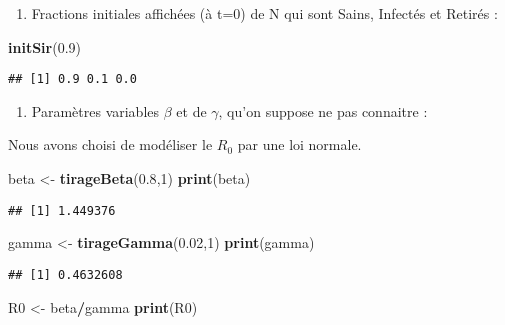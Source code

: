 \documentclass[
]{article}
\newenvironment{Shaded}{\begin{snugshade}}{\end{snugshade}}
\newcommand{\DecValTok}[1]{\textcolor[rgb]{0.00,0.00,0.81}{#1}}
\newcommand{\FloatTok}[1]{\textcolor[rgb]{0.00,0.00,0.81}{#1}}
\newcommand{\KeywordTok}[1]{\textcolor[rgb]{0.13,0.29,0.53}{\textbf{#1}}}
\newcommand{\NormalTok}[1]{#1}
\newcommand{\OperatorTok}[1]{\textcolor[rgb]{0.81,0.36,0.00}{\textbf{#1}}}
\newcommand{\StringTok}[1]{\textcolor[rgb]{0.31,0.60,0.02}{#1}}
\providecommand{\tightlist}{%
  \setlength{\itemsep}{0pt}\setlength{\parskip}{0pt}}
\begin{document}
\begin{enumerate}
\def\labelenumi{\alph{enumi}.}
\tightlist
\item
  Fractions initiales affichées (à t=0) de N qui sont Sains, Infectés et
  Retirés :
\end{enumerate}

\begin{Shaded}
\begin{Highlighting}[]
\KeywordTok{initSir}\NormalTok{(}\FloatTok{0.9}\NormalTok{)}
\end{Highlighting}
\end{Shaded}

\begin{verbatim}
## [1] 0.9 0.1 0.0
\end{verbatim}

\begin{enumerate}
\def\labelenumi{\alph{enumi}.}
\setcounter{enumi}{1}
\tightlist
\item
  Paramètres variables \(\beta\) et de \(\gamma\), qu'on suppose ne pas
  connaitre :
\end{enumerate}

Nous avons choisi de modéliser le \(R_0\) par une loi normale.

\begin{Shaded}
\begin{Highlighting}[]
\NormalTok{beta <-}\StringTok{ }\KeywordTok{tirageBeta}\NormalTok{(}\FloatTok{0.8}\NormalTok{,}\DecValTok{1}\NormalTok{)}
\KeywordTok{print}\NormalTok{(beta)}
\end{Highlighting}
\end{Shaded}

\begin{verbatim}
## [1] 1.449376
\end{verbatim}

\begin{Shaded}
\begin{Highlighting}[]
\NormalTok{gamma <-}\StringTok{ }\KeywordTok{tirageGamma}\NormalTok{(}\FloatTok{0.02}\NormalTok{,}\DecValTok{1}\NormalTok{)}
\KeywordTok{print}\NormalTok{(gamma)}
\end{Highlighting}
\end{Shaded}

\begin{verbatim}
## [1] 0.4632608
\end{verbatim}

\begin{Shaded}
\begin{Highlighting}[]
\NormalTok{R0 <-}\StringTok{ }\NormalTok{beta}\OperatorTok{/}\NormalTok{gamma}
\KeywordTok{print}\NormalTok{(R0)}
\end{Highlighting}
\end{Shaded}
\end{document}

